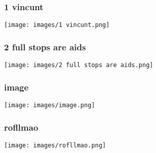 \begin{frame}

\begin{frame}
\frametitle{1 vincunt}
\texttt{[image: images/1 vincunt.png]}
\end{frame}

\begin{frame}
\frametitle{2 full stops are aids}
\texttt{[image: images/2 full stops are aids.png]}
\end{frame}

\begin{frame}
\frametitle{image}
\texttt{[image: images/image.png]}
\end{frame}

\begin{frame}
\frametitle{rofllmao}
\texttt{[image: images/rofllmao.png]}
\end{frame}

\end{frame}
